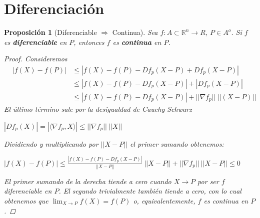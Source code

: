 \documentclass[]{article}
\newtheorem{prop}[teo]{Proposición}
\def\R{\mathbb{R}}
\newcommand{\ip}[2]{\langle #1,#2 \rangle}
\begin{document}
\section{Diferenciación}
\begin{prop}[Diferenciable $\Rightarrow$ Continua]
	Sea $f:A \subset \R^n \to R$, $P \in A^o$. Si $f$ es \textbf{diferenciable} en $P$, entonces $f$ es \textbf{continua} en $P$.
	\begin{proof}
		Consideremos
		\begin{eqnarray*}
			& |f(X) - f(P)| & \leq |f(X) - f(P) - Df_p(X-P) + Df_p(X-P)| \\
			& & \leq |f(X) - f(P) - Df_p(X-P)| + |Df_p(X-P)| \\
			& & \leq |f(X) - f(P) - Df_p(X-P)| + ||\nabla f_p ||\ ||(X-P)||
		\end{eqnarray*}
		El último término sale por la desigualdad de Cauchy-Schwarz
		\begin{center}
			$|Df_p(X)| = |\ip{\nabla f_p}{X}| \leq ||\nabla f_p||\ ||X||$
		\end{center}
		
		Dividiendo y multiplicando por $||X-P||$ el primer sumando obtenemos:
		\begin{center}
			$|f(X)-f(P)|\leq \displaystyle \frac{|f(X)-f(P)-Df_p(X-P)|}{||X-P||}\ ||X-P||+||\nabla f_p||\ ||X-P|| \leq 0$
		\end{center}
		El primer sumando de la derecha tiende a cero cuando $X\to P$ por ser $f$ diferenciable en $P$. El segundo trivialmente también tiende a cero, con lo cual obtenemos que $\displaystyle \lim_{X\to P} f(X) = f(P)$ o, equivalentemente, $f$ es continua en $P$.
	\end{proof}
\end{prop}
\end{document}
